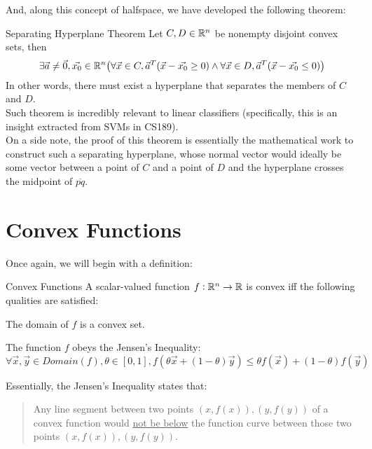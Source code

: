 And, along this concept of halfspace, we have developed the following theorem:
\begin{ln-theorem}{Separating Hyperplane Theorem}{}
    Let $C, D \in \mathbb{R}^n$ be nonempty disjoint convex sets, then
    \[
        \exists \vec{a} \neq \vec{0}, \vec{x_0} \in \mathbb{R}^n \big( \forall \vec{x} \in C, \vec{a}^T (\vec{x} - \vec{x_0} \geq 0) \land \forall \vec{x} \in D, \vec{a}^T (\vec{x} - \vec{x_0} \leq 0) \big)
    \]
    In other words, there must exist a hyperplane that separates the members of $C$ and $D$. \\
    Such theorem is incredibly relevant to linear classifiers (specifically, this is an insight extracted from SVMs in CS189). \\
    On a side note, the proof of this theorem is essentially the mathematical work to construct such a separating hyperplane, whose normal vector would ideally be some vector between a point of $C$ and a point of $D$ and the hyperplane crosses the midpoint of $\overline{pq}$.
\end{ln-theorem}

\section{Convex Functions}
Once again, we will begin with a definition:
\begin{ln-define}{Convex Functions}{}
    A scalar-valued function $f: \mathbb{R}^n \rightarrow \mathbb{R}$ is convex iff the following qualities are satisfied:
    \begin{bindenum}
        \item The domain of $f$ is a convex set.
        \item The function $f$ obeys the Jensen's Inequality:
        \[
            \forall \vec{x}, \vec{y} \in Domain(f), \theta \in [0, 1], f(\theta \vec{x} + (1 - \theta) \vec{y}) \leq \theta f(\vec{x}) + (1 - \theta) f(\vec{y})
        \]
    \end{bindenum}
    Essentially, the Jensen's Inequality states that:
    \begin{quote}
        Any line segment between two points $(x, f(x)), (y, f(y))$ of a convex function would \underline{not be below} the function curve between those two points $(x, f(x)), (y, f(y))$.
    \end{quote}
\end{ln-define}
